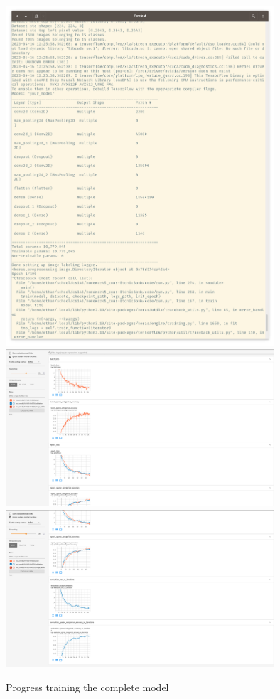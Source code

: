 \begin{figure}[H]
    \includegraphics[width=10cm]{complete-parameters.png}
    \includegraphics[width=10cm]{complete-a.png}
    \includegraphics[width=10cm]{complete-b.png}
    \caption{Progress training the complete model}
    \label{fig:result1}
\end{figure}

